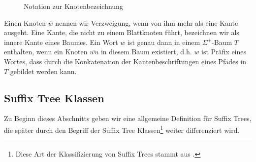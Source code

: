 \documentclass[12pt]{report}
\begin{document}
\begin{figure}[htb]
\centering
{}
\caption{Notation zur Knotenbezeichnung}
\label{fig:NotationZurKnotenbezeichnung}
\end{figure}

Einen Knoten $\overline{w}$ nennen wir Verzweigung, wenn von ihm mehr als eine Kante ausgeht. Eine Kante, die nicht zu einem Blattknoten führt, bezeichnen wir als innere Kante eines Baumes. Ein Wort $w$ ist genau dann in einem $\Sigma^+$-Baum $T$ enthalten, wenn ein Knoten $\overline{wu}$ in diesem Baum existiert, d.h. $w$ ist Präfix eines Wortes, dass durch die Konkatenation der Kantenbeschriftungen eines Pfades in $T$ gebildet werden kann.

\subsection{Suffix Tree Klassen}
\label{sec:suffixTreeKlassen}

Zu Beginn dieses Abschnitts geben wir eine allgemeine Definition für Suffix Trees, die später durch den Begriff der Suffix Tree Klassen\footnote{Diese Art der Klassifizierung von Suffix Trees stammt aus \cite{Giegerich1995}.} weiter differenziert wird.
\end{document}
